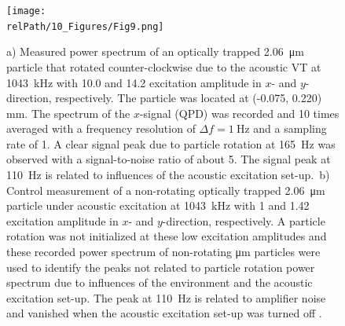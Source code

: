 \begin{figure}
    \centering
    \texttt{[image: \\relPath/10\_Figures/Fig9.png]}
    \caption{a) Measured power spectrum of an optically trapped 
    \SI{2.06}{\micro\meter} particle that rotated counter-clockwise due to the 
    acoustic VT at \SI{1043}{\kilo\hertz} with \SI{10.0}{\Vrms} and 
    \SI{14.2}{\Vrms} excitation amplitude in $x$- and $y$-direction, 
    respectively. The particle was located at (-0.075, 0.220) \si{\mm}. The 
    spectrum of the $x$-signal (QPD) was recorded and 10 times averaged with a 
    frequency resolution of $\Delta f=\SI{1}{\hertz}$ and a sampling rate of 
    \SI{1}{\MS}. A clear signal peak due to particle rotation at 
  \SI{165}{\hertz} was observed with a signal-to-noise ratio of about 5. The 
signal peak at \SI{110}{\hertz} is related to influences of the acoustic 
excitation set-up.\ b) Control measurement of a non-rotating optically trapped 
\SI{2.06}{\micro\meter} particle under acoustic excitation at 
\SI{1043}{\kilo\hertz} with \SI{1}{\Vrms} and \SI{1.42}{\Vrms} excitation 
amplitude in $x$- and $y$-direction, respectively. A particle rotation was not 
initialized at these low excitation amplitudes and these recorded power spectrum 
of non-rotating \si{\micro\meter} particles were used to identify the peaks not 
related to particle rotation power spectrum due to influences of the environment 
and the acoustic excitation set-up. The peak at \SI{110}{\hertz} is related to 
amplifier noise and vanished when the acoustic excitation set-up was turned off 
\cite{Lamprecht2016}.\label{fig:VT-Fig8}}
\end{figure}

